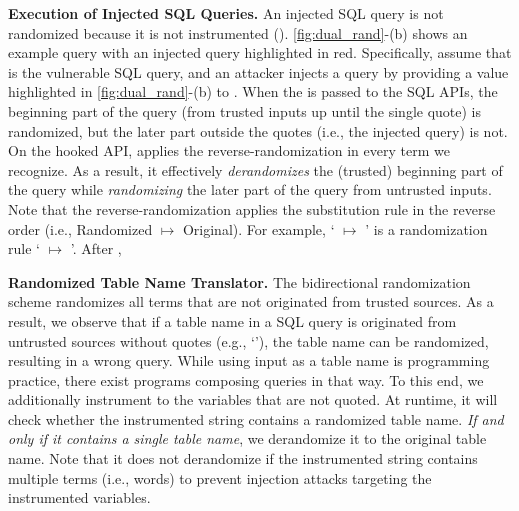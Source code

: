 \noindent
{\bf Execution of Injected SQL Queries.}
An injected SQL query is not randomized because it is not instrumented (). 
\autoref{fig:dual_rand}-(b) shows an example query with an injected query highlighted in red.
Specifically, assume that  is the vulnerable SQL query, and an attacker injects a query by providing a value highlighted in \autoref{fig:dual_rand}-(b) to .
%
When the  is passed to the SQL APIs, the beginning part of the query (from trusted inputs up until the single quote) is randomized, but the later part outside the quotes (i.e., the injected query) is not.
On the hooked API, \sysname applies the reverse-randomization in every term we recognize. %
As a result, it effectively \emph{derandomizes} the (trusted) beginning part of the query while \emph{randomizing} the later part of the query from untrusted inputs. 
Note that the reverse-randomization applies the substitution rule in the reverse order (i.e., \textsf{\color{red}  Randomized} $\mapsto$ \textsf{Original}). For example, ` $\mapsto$ ' is a randomization rule ` $\mapsto$ '.
%
After , 


\noindent
{\bf Randomized Table Name Translator.} 
The bidirectional randomization scheme randomizes all terms that are not originated from trusted sources. As a result, we observe that if a table name in a SQL query is originated from untrusted sources without quotes (e.g., `'), the table name can be randomized, resulting in a wrong query.
While using input as a table name is  programming practice, there exist programs composing queries in that way. 
To this end, we additionally instrument  to the variables that are not quoted. At runtime, it will check whether the instrumented string contains a randomized table name. \emph{If and only if it contains a single table name}, we derandomize it to the original table name. Note that it does not derandomize if the instrumented string contains multiple terms (i.e., words) to prevent injection attacks targeting the instrumented variables.


